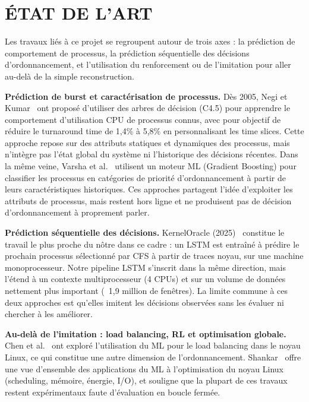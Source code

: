 \documentclass[letterpaper, 10 pt, conference]{ieeeconf}  %
\begin{document}
\section{ÉTAT DE L'ART}

Les travaux liés à ce projet se regroupent autour de trois axes :
la prédiction de comportement de processus, la prédiction 
séquentielle des décisions d'ordonnancement, et l'utilisation 
du renforcement ou de l'imitation pour aller au-delà de la 
simple reconstruction.

\textbf{Prédiction de burst et caractérisation de processus.}
Dès 2005, Negi et Kumar~\cite{4085157} ont proposé d'utiliser 
des arbres de décision (C4.5) pour apprendre le comportement 
d'utilisation CPU de processus connus, avec pour objectif de 
réduire le turnaround time de 1,4\% à 5,8\% en personnalisant 
les time slices. Cette approche repose sur des attributs 
statiques et dynamiques des processus, mais n'intègre pas 
l'état global du système ni l'historique des décisions récentes.
Dans la même veine, Varsha et al.~\cite{MLengine} utilisent 
un moteur ML (Gradient Boosting) pour classifier les processus 
en catégories de priorité d'ordonnancement à partir de leurs 
caractéristiques historiques. Ces approches partagent l'idée 
d'exploiter les attributs de processus, mais restent hors ligne 
et ne produisent pas de décision d'ordonnancement à proprement 
parler.

\textbf{Prédiction séquentielle des décisions.}
KernelOracle (2025)~\cite{kahu2025kerneloraclepredictinglinuxschedulers} 
constitue le travail le plus proche du nôtre dans ce cadre : 
un LSTM est entraîné à prédire le prochain processus sélectionné 
par CFS à partir de traces noyau, sur une machine monoprocesseur. 
Notre pipeline LSTM s'inscrit dans la même direction, mais 
l'étend à un contexte multiprocesseur (4 CPUs) et sur un volume 
de données nettement plus important (~1,9 million de fenêtres). 
La limite commune à ces deux approches est qu'elles imitent 
les décisions observées sans les évaluer ni chercher à les 
améliorer.

\textbf{Au-delà de l'imitation : load balancing, RL et 
optimisation globale.}
Chen et al.~\cite{10.1145/3409963.3410492} ont exploré 
l'utilisation du ML pour le load balancing dans le noyau Linux, 
ce qui constitue une autre dimension de l'ordonnancement. 
Shankar~\cite{article} offre une vue d'ensemble des applications 
du ML à l'optimisation du noyau Linux (scheduling, mémoire, 
énergie, I/O), et souligne que la plupart de ces travaux restent 
expérimentaux faute d'évaluation en boucle fermée.
\end{document}
